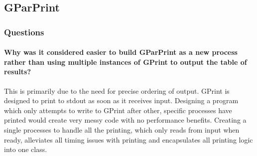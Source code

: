 \subsection{GParPrint}

\subsubsection*{Questions}

\paragraph{Why was it considered easier to build GParPrint as a new process rather than using multiple instances of GPrint to output the table of results?}

This is primarily due to the need for precise ordering of output.  GPrint is designed to print to stdout as soon as it receives input.  Designing a program which only attempts to write to GPrint after other, specific processes have printed would create very messy code with no performance benefits.  Creating a single processes to handle all the printing, which only reads from input when ready, alleviates all timing issues with printing and encapsulates all printing logic into one class.
